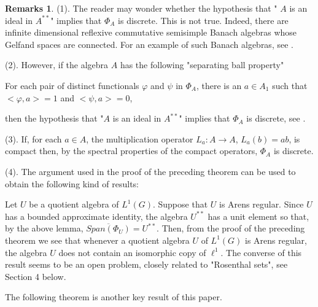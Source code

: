 \documentclass[12pt, twoside, leqno]{article}
\theoremstyle{definition}
\newtheorem{remarks}[theorem]{Remarks}
\theoremstyle{definition}
\numberwithin{equation}{section}
\begin{document}
\begin{remarks}
	(1). The reader may wonder whether the hypothesis that " $ A $ is an ideal in $ A^{**} $" implies that $ \Phi_{A} $ is discrete. This is not true. Indeed, there are infinite dimensional reflexive commutative semisimple Banach algebras whose Gelfand spaces are connected. For an example of such Banach algebras, see \cite [Example 3.3] {dales_ulger_01}.\vspace{2mm}
	
	(2). However, if the algebra $ A $ has the following "separating ball property"\vspace{2mm}
	
	For each pair of distinct functionals $ \varphi $ and $ \psi $ in $ \Phi_{A} $, there is an $ a\in A_{1} $ such that $ <\varphi,a>=1 $ and $ <\psi,a>=0 $, \vspace{2mm}
	
	\noindent then  the hypothesis that "$ A $ is an ideal in $ A^{**} $" implies that $ \Phi_{A} $ is discrete, see \cite [Corollary 3.2] {a_ulger_03}.\vspace{2mm}
	
	(3). If, for each $ a\in A $, the multiplication operator $ L_{a}:A\rightarrow A $, $ L_{a}(b)=ab $, is compact then, by the spectral properties of the compact operators, $ \Phi_{A} $ is discrete.\vspace{2mm}
	
	(4). The argument used in the proof of the preceding theorem can be used to obtain the following kind of results:\vspace{2mm}
	
	Let $ U $ be a quotient algebra of $ L^{1}(G) $. Suppose that $ U $ is Arens regular. Since $ U $ has a bounded approximate identity, the algebra $ U^{**} $ has a unit element so that, by the above lemma, $ \overline{Span(\Phi_{U})}=U^{**} $. Then, from the proof of the preceding theorem we see that whenever a quotient algebra $ U $ of $ L^{1}(G) $ is Arens regular, the algebra $ U $ does not contain an isomorphic copy of $ \ell^{1}$. The converse of this result seems to be an open problem, closely related to "Rosenthal sets", see Section 4 below.
	
\end{remarks}
The following theorem is another key result of this paper.\vspace{2mm}
\end{document}
